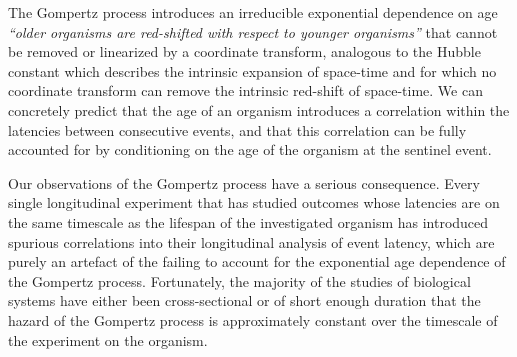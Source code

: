 \documentclass{article}
\theoremstyle{definition}\newtheorem{definition}{Definition}
\begin{document}
  The Gompertz process introduces an irreducible exponential dependence on age
  \emph{``older organisms are red-shifted with respect to younger organisms''} that cannot be
  removed or linearized by a coordinate transform, analogous to the Hubble constant which
  describes the intrinsic expansion of space-time and for which no coordinate transform can
  remove the intrinsic red-shift of space-time. We can concretely predict that the age of an
  organism introduces a correlation within the latencies between consecutive events, and
  that this correlation can be fully accounted for by conditioning on the age of the
  organism at the sentinel event. 
  
  Our observations of the Gompertz process have a serious consequence. Every single
  longitudinal experiment that has studied outcomes whose latencies are on the same
  timescale as the lifespan of the investigated organism has introduced spurious
  correlations into their longitudinal analysis of event latency, which are purely an
  artefact of the failing to account for the exponential age dependence of the Gompertz
  process. Fortunately, the majority of the studies of biological systems have either been
  cross-sectional or of short enough duration that the hazard of the Gompertz process is
  approximately constant over the timescale of the experiment on the organism.
\end{document}
